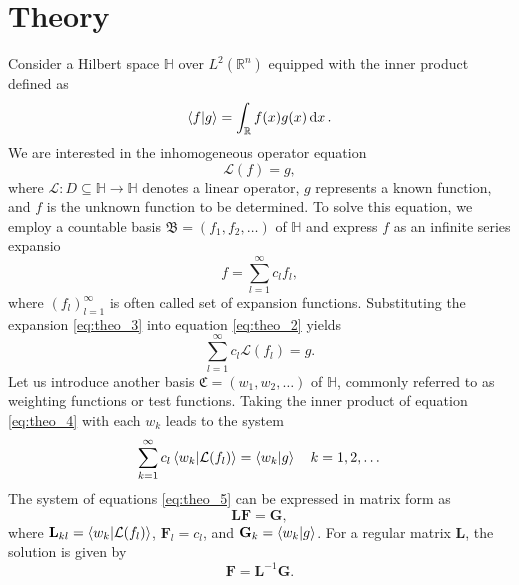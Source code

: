 \section{Theory}

Consider a Hilbert space $\mathbb{H}$ over $L^2(\mathbb{R}^n)$ equipped with the inner product defined as
\begin{equation}
    \label{eq:theo_1}
    \braket{f}{g} = \int_{\mathbb{R}} f(x) g(x) \dd{x}.
\end{equation}
We are interested in the inhomogeneous operator equation
\begin{equation}
    \label{eq:theo_2}
    \mathcal{L}(f) = g,
\end{equation}
where $\mathcal{L}: D\subseteq \mathbb{H} \to \mathbb{H}$ denotes a linear operator, $g$ represents a known function, and $f$ is the unknown function to be determined. To solve this equation, we employ a countable basis $\mathfrak{B} = (f_1, f_2, \dots)$ of $\mathbb{H}$ and express $f$ as an infinite series expansio
\begin{equation}
    \label{eq:theo_3}
    f = \sum_{l = 1}^{\infty} c_l f_l,
\end{equation}
where $\left(f_l\right)_{l = 1}^{\infty}$ is often called set of expansion functions. Substituting the expansion \eqref{eq:theo_3} into equation \eqref{eq:theo_2} yields
\begin{equation}
    \label{eq:theo_4}
    \sum_{l = 1}^{\infty} c_l \mathcal{L}(f_l) = g.
\end{equation}
Let us introduce another basis $\mathfrak{C} = (w_1, w_2, \dots)$ of $\mathbb{H}$, commonly referred to as weighting functions or test functions. Taking the inner product of equation \eqref{eq:theo_4} with each $w_k$ leads to the system
\begin{equation}
    \label{eq:theo_5}
    \sum_{k = 1}^{\infty} c_l \braket{w_k}{\mathcal{L}(f_l)} = \braket{w_k}{g}\quad k = 1,2,\dots
\end{equation}
The system of equations \eqref{eq:theo_5} can be expressed in matrix form as
\begin{equation}
    \label{eq:theo_6}
    \mathbf{L}\mathbf{F} = \mathbf{G},
\end{equation}
where $\mathbf{L}_{kl} = \braket{w_k}{\mathcal{L}(f_l)}$, $\mathbf{F}_l = c_l$, and $\mathbf{G}_k = \braket{w_k}{g}$.
For a regular matrix $\mathbf{L}$, the solution is given by
\begin{equation}
    \label{eq:theo_7}
    \mathbf{F} = \mathbf{L}^{-1}\mathbf{G}.
\end{equation}
